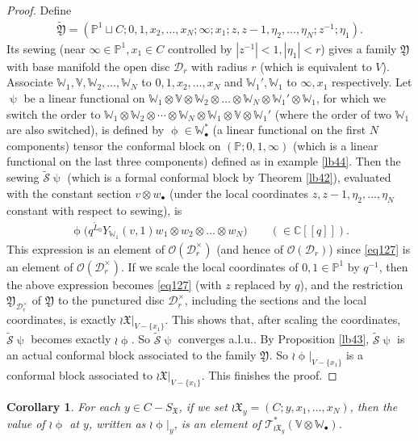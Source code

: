\documentclass[12pt,a4paper,notitlepage]{report}
\theoremstyle{definition}
\theoremstyle{plain}
\newtheorem{co}[df]{Corollary}
\newcommand{\fk}{\mathfrak}
\newcommand{\mc}{\mathcal}
\newcommand{\wtd}{\widetilde}
\newcommand{\scr}{\mathscr}
\newcommand{\SX}{S_{\fk X}}
\newcommand{\blt}{\bullet}
\newcommand{\Vbb}{\mathbb V}
\newcommand{\Wbb}{\mathbb W}
\newcommand{\Cbb}{\mathbb C}
\newcommand{\Pbb}{\mathbb P}
\numberwithin{equation}{section}
\begin{document}
\begin{proof}
Define
\begin{align*}
\wtd{\fk Y}=(\Pbb^1\sqcup C;0,1,x_2,\dots,x_N;\infty;x_1;z,z-1,\eta_2,\dots,\eta_N;z^{-1};\eta_1).
\end{align*}
Its sewing (near $\infty\in\Pbb^1,x_1\in C$ controlled by $|z^{-1}|<1,|\eta_1|<r$) gives a family $\fk Y$ with base manifold the open disc $\mc D_r$ with radius $r$ (which is equivalent to $V$). Associate $\Wbb_1,\Vbb,\Wbb_2,\dots,\Wbb_N$ to $0,1,x_2,\dots,x_N$ and $\Wbb_1',\Wbb_1$ to $\infty,x_1$ respectively. Let $\uppsi$ be a linear functional on $\Wbb_1\otimes\Vbb\otimes\Wbb_2\otimes\dots\otimes\Wbb_N\otimes \Wbb_1'\otimes \Wbb_1$, for which we switch the order to $\Wbb_1\otimes\Wbb_2\otimes\cdots\otimes\Wbb_N\otimes \Wbb_1\otimes\Vbb\otimes\Wbb_1'$ (where the order of two $\Wbb_1$ are also switched), is defined by $\upphi\in\Wbb_\blt^*$ (a linear functional on the first $N$ components) tensor the conformal block on $(\Pbb;0,1,\infty)$ (which is a linear functional on the last three components) defined as in example \ref{lb44}. Then the sewing $\wtd{\mc S}\uppsi$ (which is a formal conformal block by Theorem \ref{lb42}), evaluated with the constant section $v\otimes w_\blt$ (under the local coordinates $z,z-1,\eta_2,\dots,\eta_N$ constant with respect to sewing), is
\begin{align*}
\upphi\big(q^{\wtd L_0}Y_{\Wbb_1}(v,1)w_1\otimes w_2\otimes \dots\otimes w_N\big)\qquad (\in\Cbb[[q]]).
\end{align*}
This expression is an element of $\scr O(\mc D_r^\times)$ (and hence of $\scr O(\mc D_r)$) since \eqref{eq127} is an element of $\scr O(\mc D_r^\times)$. If we scale the local coordinates of $0,1\in\Pbb^1$ by $q^{-1}$, then the above expression becomes \eqref{eq127} (with $z$ replaced by $q$), and the restriction $\fk Y_{\mc D_r^\times}$ of $\fk Y$ to the punctured disc $\mc D_r^\times$, including the sections and the local coordinates, is exactly  $\wr\fk X|_{V-\{x_1\}}$. This shows that, after scaling the coordinates, $\wtd {\mc S}\uppsi$ becomes exactly $\wr\upphi$. So $\wtd {\mc S}\uppsi$ converges a.l.u..    By Proposition \ref{lb43}, $\wtd{\mc S}\uppsi$ is an actual conformal block associated to the family $\fk Y$. So $\wr\upphi|_{V-\{x_1\}}$ is a conformal block associated to $\wr\fk X|_{V-\{x_1\}}$. This finishes the proof. 
\end{proof}



\begin{co}\label{lb127}
For each $y\in C-\SX$, if we set $\wr\fk X_y=(C;y,x_1,\dots,x_N)$, then the value of $\wr\upphi$ at $y$, written as $\wr\upphi|_y$, is an element of $\scr T_{\wr\fk X_y}^*(\Vbb\otimes\Wbb_\blt)$.
\end{co}
\end{document}
